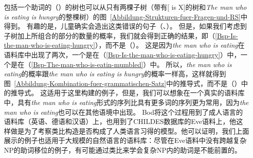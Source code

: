 包括一个助词的（）的树也可以从只有两棵子树（带有[ is X]的树和\emph{The man who is eating is hungry}的整棵树）的图~\ref{Abbildung-Strukturen-fuer-Fragen-und-RS}中得到。
\z
有趣的是，儿童确实会造出这类错误的句子（\citealp[]{CN87a-u}、\citealp*{ARP2008a}）。
但是，如果我们考虑到子树加上所组合的部分的数量的概率，我们就会得到正确的结果，即（\ref{Bsp-Is-the-man-who-is-eating-hungry}），而不是（）。
这是因为\emph{the man who is eating}在语料库中出现了两次，一个是在（\ref{Bsp-Is-the-man-who-is-eating-hungry}）中，一个是在（\ref{Bsp-The-man-who-is-eatin-mumbled}）中。
所以，\emph{the man who
  is eating}的概率跟\emph{the man who is eating is hungry}的概率一样高，这样就得到图~\ref{Abbildung-Kombination-fuer-grammatischen-Satz}中的推导式，而不是（）中的推导式。
这适用于这里构建的例子，但是，我们可以想象在一个真实的语料库中，具有\emph{the man who is eating}形式的序列比具有更多词的序列更为常用，因为\emph{the man who is eating}也可以在其他语境中出现。
Bod将这个过程用到了成人语言的语料库（英语、德语和汉语）上，也用到了CHILDES数据库的Eve语料上，他这样做是为了考察类比构造是否构成了人类语言习得的模型。他可以证明，我们上面展示的例子也适用于大规模的自然语言的语料库：尽管在Eve语料中没有跨越复杂NP的助词移位的例子，有可能通过类比来学会复杂NP内的助词是不能前置的。
